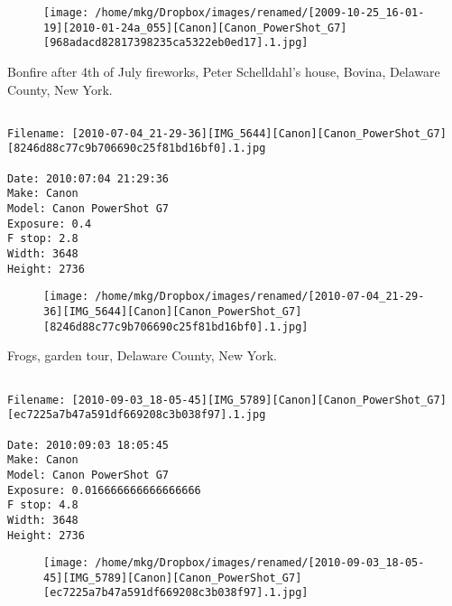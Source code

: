\begin{figure}
\texttt{[image: /home/mkg/Dropbox/images/renamed/[2009-10-25\_16-01-19][2010-01-24a\_055][Canon][Canon\_PowerShot\_G7][968adacd82817398235ca5322eb0ed17].1.jpg]}
\end{figure}
    
\clearpage
\onecolumn
\noindent Bonfire after 4th of July fireworks, Peter Schelldahl's house, Bovina, Delaware County, New York.
\noindent
\begin{lstlisting}

Filename: [2010-07-04_21-29-36][IMG_5644][Canon][Canon_PowerShot_G7][8246d88c77c9b706690c25f81bd16bf0].1.jpg

Date: 2010:07:04 21:29:36
Make: Canon
Model: Canon PowerShot G7
Exposure: 0.4
F stop: 2.8
Width: 3648
Height: 2736
\end{lstlisting}
\clearpage

\begin{figure}
\texttt{[image: /home/mkg/Dropbox/images/renamed/[2010-07-04\_21-29-36][IMG\_5644][Canon][Canon\_PowerShot\_G7][8246d88c77c9b706690c25f81bd16bf0].1.jpg]}
\end{figure}
    
\clearpage
\onecolumn
\noindent Frogs, garden tour, Delaware County, New York.
\noindent
\begin{lstlisting}

Filename: [2010-09-03_18-05-45][IMG_5789][Canon][Canon_PowerShot_G7][ec7225a7b47a591df669208c3b038f97].1.jpg

Date: 2010:09:03 18:05:45
Make: Canon
Model: Canon PowerShot G7
Exposure: 0.016666666666666666
F stop: 4.8
Width: 3648
Height: 2736
\end{lstlisting}
\clearpage

\begin{figure}
\texttt{[image: /home/mkg/Dropbox/images/renamed/[2010-09-03\_18-05-45][IMG\_5789][Canon][Canon\_PowerShot\_G7][ec7225a7b47a591df669208c3b038f97].1.jpg]}
\end{figure}
    
